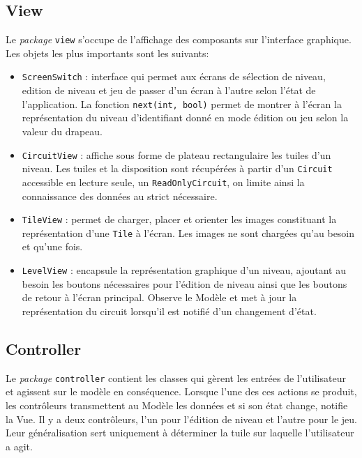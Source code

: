 \documentclass{article}
\begin{document}
\subsection{View}
Le {\em package} {\tt view} s'occupe de l'affichage des composants sur
l'interface graphique. Les objets les plus importants sont les suivants:
\begin{itemize}
\item {\tt ScreenSwitch} : interface qui permet aux écrans de sélection de
  niveau, edition de niveau et jeu de passer d'un écran à l'autre selon l'état
  de l'application. La fonction {\tt next(int, bool)} permet de montrer à
  l'écran la représentation du niveau d'identifiant donné en mode édition ou jeu
  selon la valeur du drapeau.
\item {\tt CircuitView} : affiche sous forme de plateau rectangulaire les tuiles
  d'un niveau. Les tuiles et la disposition sont récupérées à partir d'un
  {\tt Circuit} accessible en lecture seule, un {\tt ReadOnlyCircuit}, on limite
  ainsi la connaissance des données au strict nécessaire.
\item {\tt TileView} : permet de charger, placer et orienter les images
  constituant la représentation d'une {\tt Tile} à l'écran. Les images ne sont
  chargées qu'au besoin et qu'une fois.
\item {\tt LevelView} : encapsule la représentation graphique d'un niveau,
  ajoutant au besoin les boutons nécessaires pour l'édition de niveau ainsi que
  les boutons de retour à l'écran principal. Observe le Modèle et met à jour
  la représentation du circuit lorsqu'il est notifié d'un changement d'état.
\end{itemize}

\subsection{Controller}
Le {\em package} {\tt controller} contient les classes qui gèrent les entrées
de l'utilisateur et agissent sur le modèle en conséquence. Lorsque l'une des ces
actions se produit, les contrôleurs transmettent au Modèle les données et si son
état change, notifie la Vue. Il y a deux contrôleurs, l'un pour l'édition de
niveau et l'autre pour le jeu. Leur généralisation sert uniquement à déterminer
la tuile sur laquelle l'utilisateur a agit.
\end{document}
